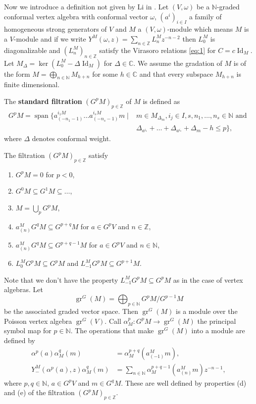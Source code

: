 \documentclass[12pt,a4paper]{article}
\DeclareMathOperator{\Id}{Id}
\DeclareMathOperator{\gr}{gr}
\DeclareMathOperator{\vspan}{span}
\begin{document}
Now we introduce a definition not given by Li in \cite{li_vertex_2002}.
Let $(V,\omega)$ be a $\mathbb{N}$-graded conformal vertex algebra with conformal vector $\omega$, $(a^i)_{i\in I}$ a family of homogeneous strong generators of $V$ and $M$ a $(V,\omega)$-module which means $M$ is a $V$-module and if we write $Y^M(\omega,z)=\sum_{n\in \mathbb{Z}}L^M_nz^{-n-2}$ then $L_0^M$ is diagonalizable and $(L^M_n)_{n\in \mathbb{Z}}$ satisfy the Virasoro relations \eqref{eq:1} for $C=c\Id_M$.
Let $M_\Delta=\ker(L^M_0-\Delta \Id_{M})$ for $\Delta\in \mathbb{C}$.
We assume the gradation of $M$ is of the form $M=\bigoplus_{n\in \mathbb{N}}M_{h+n}$ for some $h\in \mathbb{C}$ and that every subspace $M_{h+n}$ is finite dimensional.

The \textbf{standard filtration} $(G^pM)_{p\in \mathbb{Z}}$ of $M$ is defined as
\begin{equation*}
  \begin{split}
    G^pM=\vspan\{a^{i_1 M}_{(-n_1-1)}\dots a^{i_s M}_{(-n_s-1)}m\mid& m\in M_{\Delta_m}, i_j\in I, s,n_1,\dots, n_s\in \mathbb{N}\text{ and }\\
    &\Delta_{a^{i_1}}+\dots+\Delta_{a^{i_s}}+\Delta_m-h\le p\},
  \end{split}
\end{equation*}
where $\Delta$ denotes conformal weight.

The filtration $(G^pM)_{p\in \mathbb{Z}}$ satisfy
\begin{enumerate}[label={(\alph*)}]
\item $G^pM=0$ for $p<0$,
\item $G^0M\subseteq G^1M\subseteq\dots$,
\item $M=\bigcup_pG^pM$,
\item $a^M_{(n)}G^qM\subseteq G^{p+q}M$ for $a\in G^pV$ and $n\in \mathbb{Z}$,
\item $a^M_{(n)}G^qM\subseteq G^{p+q-1}M$ for $a\in G^pV$ and $n\in \mathbb{N}$,
\item $L^M_0G^pM\subseteq G^pM$ and $L^M_{-1}G^pM\subseteq G^{p+1}M$.
\end{enumerate}
Note that we don't have the property $L_{-1}^MG^pM\subseteq G^pM$ as in the case of vertex algebras.
Let
\begin{equation*}
  \gr^G(M)=\bigoplus_{p\in \mathbb{N}}G^pM/G^{p-1}M
\end{equation*}
be the associated graded vector space.
Then $\gr^G(M)$ is a module over the Poisson vertex algebra $\gr^G(V)$.
Call $\alpha^p_M:G^pM\to \gr^G(M)$ the principal symbol map for $p\in \mathbb{N}$.
The operations that make $\gr^G(M)$ into a module are defined by
\begin{align*}
  \alpha^p(a)\alpha^q_M(m)&=\alpha^{p+q}_M(a^M_{(-1)}m), \\
  Y^M_{-}(\alpha^p(a), z)\alpha^q_M(m)&=\sum_{n\in \mathbb{N}}\alpha^{p+q-1}_M(a^M_{(n)}m)z^{-n-1},
\end{align*}
where $p,q\in \mathbb{N}$, $a\in G^pV$ and $m\in G^qM$.
These are well defined by properties (d) and (e) of the filtration $(G^pM)_{p\in \mathbb{Z}}$.
\end{document}
